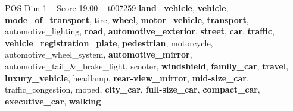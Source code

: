 \begin{textsample}{POS Dim 1 – Score 19.00 – t007259}  \label{ex:f1_pos_023}
\textbf{land\_vehicle}, \textbf{vehicle}, \textbf{mode\_of\_transport}, tire, \textbf{wheel}, \textbf{motor\_vehicle}, \textbf{transport}, automotive\_lighting, \textbf{road}, \textbf{automotive\_exterior}, \textbf{street}, \textbf{car}, \textbf{traffic}, \textbf{vehicle\_registration\_plate}, \textbf{pedestrian}, motorcycle, automotive\_wheel\_system, \textbf{automotive\_mirror}, automotive\_tail\_\&\_brake\_light, scooter, \textbf{windshield}, \textbf{family\_car}, \textbf{travel}, \textbf{luxury\_vehicle}, headlamp, \textbf{rear-view\_mirror}, \textbf{mid-size\_car}, traffic\_congestion, moped, \textbf{city\_car}, \textbf{full-size\_car}, \textbf{compact\_car}, \textbf{executive\_car}, \textbf{walking}

\end{textsample}
